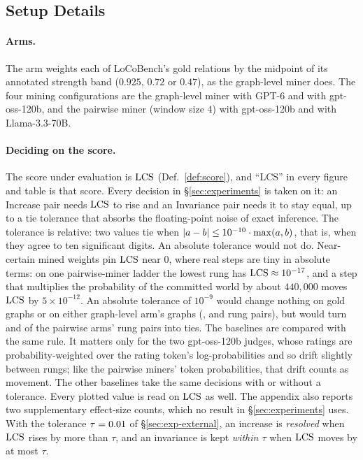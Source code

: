 \subsection{Setup Details}
\label{app:setup-details}

\paragraph{Arms.} The  arm weights each of LoCoBench's gold relations by the midpoint of its
annotated strength band ($0.925$, $0.72$ or $0.47$), as the graph-level miner does. The four mining
configurations are the graph-level miner with GPT-6 and with gpt-oss-120b, and the pairwise miner
(window size $4$) with gpt-oss-120b and with Llama-3.3-70B.

\paragraph{Deciding on the score.} The score under evaluation is $\mathrm{LCS}$ (Def.~\ref{def:score}),
and ``LCS'' in every figure and table is that score. Every decision in \S\ref{sec:experiments} is
taken on it: an Increase pair needs $\mathrm{LCS}$ to rise and an Invariance pair needs it to stay equal, up
to a tie tolerance that absorbs the floating-point noise of exact inference. The tolerance is
relative: two values tie when $|a-b|\le10^{-10}\cdot\max(a,b)$, that is, when they agree to
ten significant digits. An absolute tolerance would not do. Near-certain mined weights pin $\mathrm{LCS}$
near $0$, where real steps are tiny in absolute terms: on one pairwise-miner ladder the lowest rung
has $\mathrm{LCS}\approx10^{-17}$, and a step that multiplies the probability of the committed world by
about $440{,}000$ moves $\mathrm{LCS}$ by $5\times10^{-12}$. An absolute tolerance of $10^{-9}$ would change
nothing on gold graphs or on either graph-level arm's graphs (\sThreeGoldLcsAbsDis,
\sThreeGraphGptLcsAbsDis{} and \sThreeGraphOssLcsAbsDis{} rung pairs), but would turn
\sThreePairOssLcsAbsDis{} and \sThreePairLlamaLcsAbsDis{} of the pairwise arms' rung pairs into
ties. The baselines are compared with the same rule. It matters only for the two gpt-oss-120b
judges, whose ratings are probability-weighted over the rating token's log-probabilities and so
drift slightly between rungs; like the pairwise miners' token probabilities, that drift counts as
movement. The other baselines take the same decisions with or without a tolerance. Every plotted
value is read on $\mathrm{LCS}$ as well. The appendix also reports two supplementary
effect-size counts, which no result in \S\ref{sec:experiments} uses. With the tolerance
$\tau=0.01$ of \S\ref{sec:exp-external}, an increase is \emph{resolved} when $\mathrm{LCS}$ rises by
more than $\tau$, and an invariance is kept \emph{within $\tau$} when $\mathrm{LCS}$ moves by at most
$\tau$.


